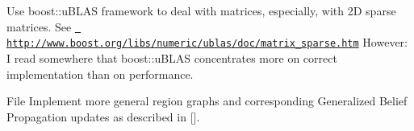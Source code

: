 \begin{DoxyRefList}
\label{ideas__ideas000009}%
%
 Use boost\+::u\+BLAS framework to deal with matrices, especially, with 2D sparse matrices. See \href{http://www.boost.org/libs/numeric/ublas/doc/matrix_sparse.htm}{\texttt{ http\+://www.\+boost.\+org/libs/numeric/ublas/doc/matrix\+\_\+sparse.\+htm}} However\+: I read somewhere that boost\+::u\+BLAS concentrates more on correct implementation than on performance.  
\item[File \doxylink{hak_8h}{hak.h} ]\label{ideas__ideas000011}%
%
 Implement more general region graphs and corresponding Generalized Belief Propagation updates as described in \mbox{[}\mbox{]}. 


\end{DoxyRefList}